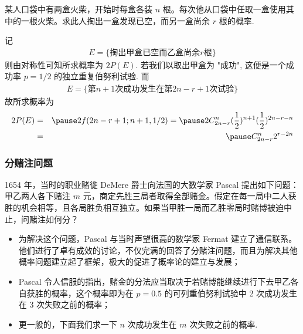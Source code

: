 \documentclass[Prob-All.tex]{subfiles}
\begin{document}
\begin{frame}
	\begin{exam}
		某人口袋中有两盒火柴，开始时每盒各装 $n$ 根。每次他从口袋中任取一盒使用其中的一根火柴。求此人掏出一盒发现已空，而另一盒尚余 $r$ 根的概率.
	\end{exam}

	\pause
	\jieda 记
	\begin{eqnarray*}
		E=\{\mbox{掏出甲盒已空而乙盒尚余} r\mbox{根}\}
	\end{eqnarray*}
	\pause 则由对称性可知所求概率为 $2P (E)$. \pause 若我们以取出甲盒为 "成功", 这便是一个成功率 $p=1/2$ 的独立重复伯努利试验.
	\pause 而
	\begin{eqnarray*}
		E=\{\mbox{第} n+1\mbox{次成功发生在第} 2n-r+1\mbox{次试验}\}
	\end{eqnarray*}
	\pause 故所求概率为
	\begin{eqnarray*}
		2P(E)&=&\pause 2f(2n-r+1;n+1,1/2)=\pause 2C_{2n-r}^n(\dfrac{1}{2})^{n+1}(\dfrac{1}{2})^{2n-r-n}\\
		&=&\pause C_{2n-r}^n2^{r-2n}
	\end{eqnarray*}

\end{frame}


\begin{frame}
	\frametitle{分赌注问题}
	\begin{exam}
		1654 年，当时的职业赌徙 DeMere 爵士向法国的大数学家 Pascal 提出如下问题：甲乙两人各下赌注 $m$ 元，商定先胜三局者取得全部赌金。假定在每一局中二人获胜的机会相等，且各局胜负相互独立。如果当甲胜一局而乙胜零局时赌博被迫中止，问赌注如何分？
	\end{exam}
	\pause
	\begin{itemize}[<+-|alert@+>]
		\item 为解决这个问题，Pascal 与当时声望很高的数学家 Fermat 建立了通信联系。他们进行了卓有成效的讨论，不仅完满的回答了分赌注问题，而且为解决其他概率问题建立起了框架，极大的促进了概率论的建立与发展；
		\item Pascal 令人信服的指出，赌金的分法应当取决于若赌博能继续进行下去甲乙各自获胜的概率，这个概率即为在 $p=0.5$ 的可列重伯努利试验中 2 次成功发生在 3 次失败之前的概率；
		\item 更一般的，下面我们求一下 $n$ 次成功发生在 $m$ 次失败之前的概率.
	\end{itemize}
\end{frame}
\end{document}
